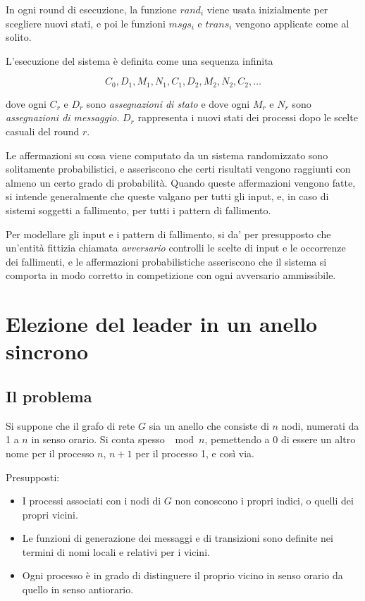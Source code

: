 \documentclass[italian,]{book}
\providecommand{\tightlist}{%
  \setlength{\itemsep}{0pt}\setlength{\parskip}{0pt}}
\begin{document}
In ogni round di esecuzione, la funzione \(rand_i\) viene usata
inizialmente per scegliere nuovi stati, e poi le funzioni \(msgs_i\) e
\(trans_i\) vengono applicate come al solito.

L'esecuzione del sistema è definita come una sequenza infinita

\[C_0,D_1,M_1,N_1,C_1,D_2,M_2,N_2,C_2,\ldots\]

dove ogni \(C_r\) e \(D_r\) sono \emph{assegnazioni di stato} e dove
ogni \(M_r\) e \(N_r\) sono \emph{assegnazioni di messaggio}. \(D_r\)
rappresenta i nuovi stati dei processi dopo le scelte casuali del round
\(r\).

Le affermazioni su cosa viene computato da un sistema randomizzato sono
solitamente probabilistici, e asseriscono che certi risultati vengono
raggiunti con almeno un certo grado di probabilità. Quando queste
affermazioni vengono fatte, si intende generalmente che queste valgano
per tutti gli input, e, in caso di sistemi soggetti a fallimento, per
tutti i pattern di fallimento.

Per modellare gli input e i pattern di fallimento, si da' per
presupposto che un'entità fittizia chiamata \emph{avversario} controlli
le scelte di input e le occorrenze dei fallimenti, e le affermazioni
probabilistiche asseriscono che il sistema si comporta in modo corretto
in competizione con ogni avversario ammissibile.

\hypertarget{elezione-del-leader-in-un-anello-sincrono}{%
\chapter{Elezione del leader in un anello
sincrono}\label{elezione-del-leader-in-un-anello-sincrono}}

\hypertarget{il-problema}{%
\section{Il problema}\label{il-problema}}

Si suppone che il grafo di rete \(G\) sia un anello che consiste di
\(n\) nodi, numerati da 1 a \(n\) in senso orario. Si conta spesso
\(\mod n\), pemettendo a 0 di essere un altro nome per il processo
\(n\), \(n + 1\) per il processo 1, e così via.

Presupposti:

\begin{itemize}
\tightlist
\item
  I processi associati con i nodi di \(G\) non conoscono i propri
  indici, o quelli dei propri vicini.
\item
  Le funzioni di generazione dei messaggi e di transizioni sono definite
  nei termini di nomi locali e relativi per i vicini.
\item
  Ogni processo è in grado di distinguere il proprio vicino in senso
  orario da quello in senso antiorario.
\end{itemize}
\end{document}
